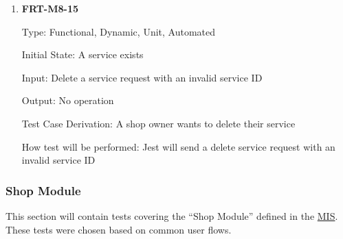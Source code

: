 \documentclass[12pt, titlepage]{article}
\begin{document}
\begin{enumerate}
	\item \textbf{FRT-M8-15}

	      Type: Functional, Dynamic, Unit, Automated

	      Initial State: A service exists

	      Input: Delete a service request with an invalid service ID

	      Output: No operation

	      Test Case Derivation: A shop owner wants to delete their service

	      How test will be performed: Jest will send a delete service request with an invalid service ID

\end{enumerate}

\subsubsection{Shop Module}

This section will contain tests covering the ``Shop Module'' defined in the
\href{https://github.com/arkinmodi/project-sayyara/blob/main/docs/Design/MIS/MIS.pdf}{MIS}. These
tests were chosen based on common user flows.
\end{document}
